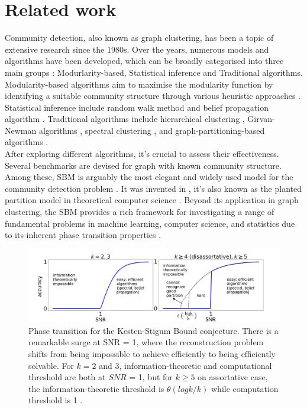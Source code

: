 \section{Related work}
Community detection, also known as graph clustering, has been a topic of extensive research since the 1980s. Over the years, numerous models and algorithms have been developed, which can be broadly categorised into three main groups \cite{review_algo}: Modurlarity-based, Statistical inference and Traditional algorithms. Modularity-based algorithms aim to maximise the modularity function by identifying a suitable community structure through various heuristic approaches  \cite{review_1_modu_Newman} \cite{review_2_modu_Newman}. Statistical inference include random walk method and belief propagation algorithm\cite{TheSurvey} \cite{TheConjecture}. Traditional algorithms include hierarchical clustering \cite{comm_dete_in_graphs}, Girvan-Newman algorithms \cite{review_Newman}, spectral clustering \cite{spec_review_1} \cite{spec_review_2}, and graph-partitioning-based algorithms \cite{partition_review}.\\
After exploring different algorithms, it's crucial to assess their effectiveness. Several benchmarks are devised for graph with known community structure. Among these, SBM is arguably the most elegant and widely used model for the community detection problem \cite{TheConjecture} \cite{userguide}. It was invented in \cite{sbm-review_1}, it's also known as the planted partition model in theoretical computer science \cite{df89}. Beyond its application in graph clustering, the SBM provides a rich framework for investigating a range of fundamental problems in machine learning, computer science, and statistics due to its inherent phase transition properties \cite{TheConjecture} \cite{Emmanuel_sbm}. \\
\begin{figure}[ht]
    \centering
    \includegraphics[width=1.1\linewidth]{Figures/phase_trans.jpg}
    \caption[Pahse transition for the Kesten-Stigum Bound conjecture]{Phase transition for the Kesten-Stigum Bound conjecture. There is a remarkable surge at SNR = 1, where the reconstruction problem shifts from being impossible to achieve efficiently to being efficiently solvable. For $k=2$ and $3$, information-theoretic and computational threshold are both at $SNR$ = 1, but for $k\geq5$ on assortative case, the information-theoretic threshold is $\theta(logk/k)$ while computation threshold is 1 \cite{TheSurvey}.}
    \label{fig:phase_trans}
\end{figure}
